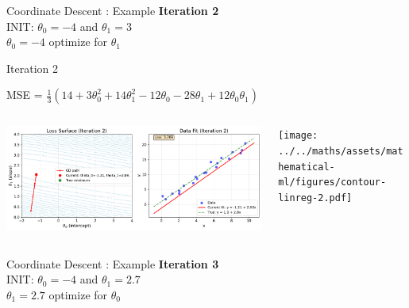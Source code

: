 \documentclass{beamer}
\begin{document}
\begin{frame}{Coordinate Descent : Example}
\textbf{Iteration 2}\\
\vspace{0.5cm}
INIT: $\theta_{0} = -4$ and  $\theta_{1}  = 3$\\

\vspace{0.5cm}
$\theta_0 = -4$ optimize for $\theta_{1}$\\ 


\end{frame}


\begin{frame}{Iteration 2}

MSE = $\frac{1}{3}(14+3\theta_{0}^{2}+14\theta_{1}^{2}-12\theta_{0}-28\theta_{1}+12\theta_{0}\theta_{1})$\\

\begin{columns}
\begin{column}{0.6\textwidth}
\begin{adjustbox}{max totalsize={\textwidth},center}
\includegraphics[width=\textwidth]{../../maths/assets/mathematical-ml/figures/gradient-descent-2.pdf}
\end{adjustbox}

\end{column}
\begin{column}{0.5\textwidth}
\begin{adjustbox}{max totalsize={\textwidth},center}
\texttt{[image: ../../maths/assets/mathematical-ml/figures/contour-linreg-2.pdf]}
\end{adjustbox}
\end{column}
\end{columns}


\end{frame}

\begin{frame}{Coordinate Descent : Example}
\textbf{Iteration 3}\\
\vspace{0.5cm}
INIT: $\theta_{0} = -4$ and $\theta_{1}  = 2.7$\\

\vspace{0.5cm}
$\theta_1 = 2.7$ optimize for $\theta_{0}$\\ 


\end{frame}
\end{document}
